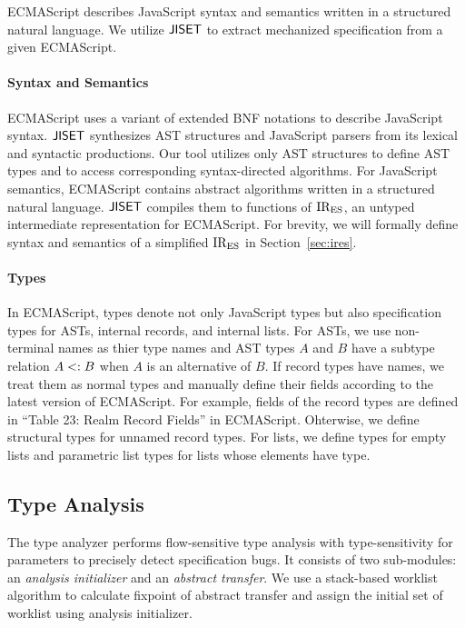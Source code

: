 ECMAScript describes JavaScript syntax and semantics written in a structured
natural language.  We utilize $\textsf{JISET}$ to extract mechanized specification from
a given ECMAScript.

\paragraph{Syntax and Semantics} ECMAScript uses a variant of extended BNF
notations to describe JavaScript syntax.  $\textsf{JISET}$ synthesizes AST structures
and JavaScript parsers from its lexical and syntactic productions.  Our tool
utilizes only AST structures to define AST types and to access corresponding
syntax-directed algorithms.  For JavaScript semantics, ECMAScript contains
abstract algorithms written in a structured natural language.  $\textsf{JISET}$ compiles
them to functions of ${\text{IR}_\text{ES}}$, an untyped intermediate representation for
ECMAScript.  For brevity, we will formally define syntax and semantics of
a simplified ${\text{IR}_\text{ES}}$ in Section~\ref{sec:ires}.

\paragraph{Types} In ECMAScript, types denote not only JavaScript types but also
specification types for ASTs, internal records, and internal lists.  For ASTs,
we use non-terminal names as thier type names and AST types $A$ and $B$ have a
subtype relation $A <: B$ when $A$ is an alternative of $B$.  If record
types have names, we treat them as normal types and manually define their fields
according to the latest version of ECMAScript.  For example, fields of the
 record types are defined in ``Table 23: Realm Record Fields'' in
ECMAScript.  Ohterwise, we define structural types for unnamed record types.
For lists, we define  types for empty lists and parametric list types
 for lists whose elements have  type.


\subsection{Type Analysis}\label{sec:overview-type-analysis}

The type analyzer performs flow-sensitive type analysis with type-sensitivity
for parameters to precisely detect specification bugs.  It consists of two
sub-modules: an \textit{analysis initializer} and an \textit{abstract transfer}.
We use a stack-based worklist algorithm to calculate fixpoint of abstract
transfer and assign the initial set of worklist using analysis initializer.

